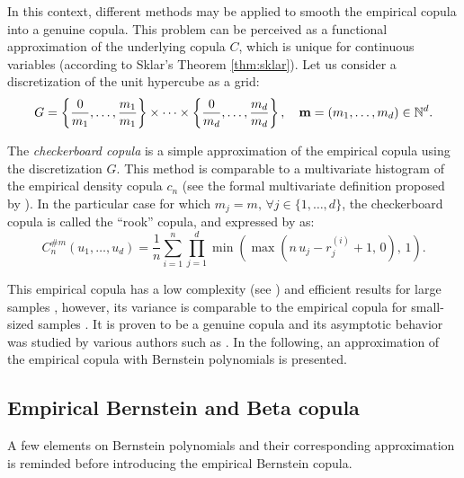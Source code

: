 In this context, different methods may be applied to smooth the empirical copula into a genuine copula. 
This problem can be perceived as a functional approximation of the underlying copula $C$, which is unique for continuous variables (according to Sklar's Theorem \ref{thm:sklar}). 
Let us consider a discretization of the unit hypercube as a grid: 
\begin{equation}
    G=\left\{\frac{0}{m_1}, \dots, \frac{m_1}{m_1}\right\} \times \dots \times \left\{\frac{0}{m_d}, \dots, \frac{m_d}{m_d}\right\}, \quad {\bf m} = (m_1, \dots, m_d) \in \mathbb{N}^d. 
\end{equation}

The \textit{checkerboard copula} is a simple approximation of the empirical copula using the discretization $G$. 
This method is comparable to a multivariate histogram of the empirical density copula $c_n$ (see the formal multivariate definition proposed by \citealt{cottin_2014_bernstein}).
In the particular case for which $m_j=m, \, \forall j \in \{1, \dots, d\}$, the checkerboard copula is called the ``rook'' copula, and expressed by \citet{segers_2017} as: 
\begin{equation}
    C_n^{\#m}(u_1, \dots, u_d) = \frac1n \sum_{i=1}^{n} \prod_{j=1}^{d} \min\left(\max(n\, u_j - r_j^{(i)} +1, \, 0), \, 1\right).
\end{equation}

This empirical copula has a low complexity (see \citealt{rose_2015}) and efficient results for large samples \citep{gonzalez_2021_checkerboard_copula}, however, its variance is comparable to the empirical copula for small-sized samples \citep{segers_2017}. 
It is proven to be a genuine copula and its asymptotic behavior was studied by various authors such as \citet{li_1998_checkerboard,genest_2017_asymptotic_checkerboard}. 
In the following, an approximation of the empirical copula with Bernstein polynomials is presented. 



\subsection{Empirical Bernstein and Beta copula}

A few elements on Bernstein polynomials and their corresponding approximation is reminded before introducing the empirical Bernstein copula.

